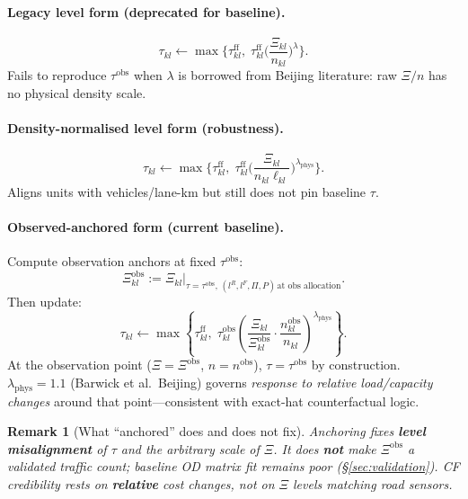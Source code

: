 \documentclass[12pt]{article}
\newtheorem{remark}{Remark}
\newcommand{\obs}{\mathrm{obs}}
\newcommand{\ff}{\mathrm{ff}}
\begin{document}
\paragraph{Legacy level form (deprecated for baseline).}
\begin{equation}
  \tau_{kl} \leftarrow \max\Big\{\tau^{\ff}_{kl},\;
    \tau^{\ff}_{kl}\Big(\frac{\Xi_{kl}}{n_{kl}}\Big)^{\lambda}\Big\}.
  \label{eq:E6_legacy}
\end{equation}
Fails to reproduce $\tau^{\obs}$ when $\lambda$ is borrowed from Beijing
literature: raw $\Xi/n$ has no physical density scale.

\paragraph{Density-normalised level form (robustness).}
\begin{equation}
  \tau_{kl} \leftarrow \max\Big\{\tau^{\ff}_{kl},\;
    \tau^{\ff}_{kl}\Big(\frac{\Xi_{kl}}{n_{kl}\ell_{kl}}\Big)^{\lambda_{\mathrm{phys}}}\Big\}.
  \label{eq:E6_density}
\end{equation}
Aligns units with vehicles/lane-km but still does not pin baseline $\tau$.

\paragraph{Observed-anchored form (\textbf{current baseline}).}
Compute observation anchors at fixed $\tau^{\obs}$:
\begin{equation}
  \Xi^{\obs}_{kl} := \Xi_{kl}\big|_{\tau=\tau^{\obs},\,(l^R,l^F,\Pi,P)\,\text{at obs allocation}}.
  \label{eq:Xi_obs}
\end{equation}
Then update:
\begin{equation}
  \boxed{
  \tau_{kl} \leftarrow \max\left\{\tau^{\ff}_{kl},\;
    \tau^{\obs}_{kl}\left(
      \frac{\Xi_{kl}}{\Xi^{\obs}_{kl}}\cdot
      \frac{n^{\obs}_{kl}}{n_{kl}}
    \right)^{\lambda_{\mathrm{phys}}}
  \right\}.
  }
  \label{eq:E6_anchored}
\end{equation}
At the observation point ($\Xi=\Xi^{\obs}$, $n=n^{\obs}$), $\tau=\tau^{\obs}$
by construction.
$\lambda_{\mathrm{phys}}=1.1$ (Barwick et al.\ Beijing) governs \emph{response
to relative load/capacity changes} around that point---consistent with exact-hat
counterfactual logic.

\begin{remark}[What ``anchored'' does and does not fix]
Anchoring fixes \textbf{level misalignment} of $\tau$ and the arbitrary scale of
$\Xi$.
It does \textbf{not} make $\Xi^{\obs}$ a validated traffic count; baseline OD
matrix fit remains poor (§\ref{sec:validation}).
CF credibility rests on \textbf{relative} cost changes, not on $\Xi$ levels
matching road sensors.
\end{remark}
\end{document}
